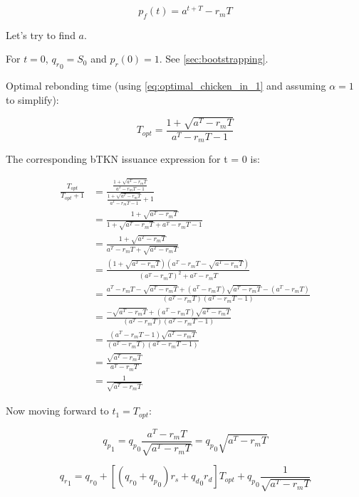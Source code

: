 \documentclass{article}
\begin{document}
\begin{equation}
  \label{eq:conservative-2}
p_f(t) = a^{t+T} - r_m T
\end{equation}

Let’s try to find $a$.

For $t=0$, ${q_r}_0 = S_0$ and $p_r(0) = 1$. See \ref{sec:bootstrapping}.

Optimal rebonding time (using \ref{eq:optimal_chicken_in_1} and assuming $\alpha = 1$ to simplify):

\begin{equation}
  \label{eq:conservative_T_OP}
T_{opt} = \frac{1+ \sqrt{a^T - r_mT}}{a^T - r_mT - 1}
\end{equation}

The corresponding bTKN issuance expression for t = 0 is:

\begin{equation}
  \label{eq:conservative_issuance_proportion}
  \begin{split}
  \frac{T_{opt}}{T_{opt} + 1} & = \frac{\frac{1+ \sqrt{a^T - r_mT}}{a^T - r_mT - 1}}{\frac{1+ \sqrt{a^T - r_mT}}{a^T - r_mT - 1} + 1} \\
  & = \frac{1+ \sqrt{a^T - r_mT}}{1+ \sqrt{a^T - r_mT} + a^T - r_mT - 1} \\
  & = \frac{1+ \sqrt{a^T - r_mT}}{a^T - r_mT + \sqrt{a^T - r_mT}} \\
  & = \frac{(1+ \sqrt{a^T - r_mT})(a^T - r_mT - \sqrt{a^T - r_mT})}{(a^T - r_mT)^2 + a^T - r_mT} \\
  & = \frac{a^T - r_mT - \sqrt{a^T - r_mT} + (a^T - r_mT)\sqrt{a^T - r_mT} - (a^T - r_mT)}{(a^T - r_mT)(a^T - r_mT - 1)} \\
  & = \frac{- \sqrt{a^T - r_mT} + (a^T - r_mT)\sqrt{a^T - r_mT}}{(a^T - r_mT)(a^T - r_mT - 1)} \\
  & = \frac{(a^T - r_mT - 1)\sqrt{a^T - r_mT}}{(a^T - r_mT)(a^T - r_mT - 1)} \\
  & = \frac{\sqrt{a^T - r_mT}}{a^T - r_mT} \\
  & = \frac{1}{\sqrt{a^T - r_mT}}
  \end{split}
\end{equation}

Now moving forward to $t_1 = T_{opt}$:

\[
{q_p}_1 = {q_p}_0 \frac{a^T -r_mT}{\sqrt{a^T -r_mT}} = {q_p}_0 \sqrt{a^T - r_mT}
\]

\[
{q_r}_1 = {q_r}_0 + [({q_r}_0 + {q_p}_0)r_s + {q_d}_0 r_d] T_{opt} + {q_p}_0 \frac{1}{\sqrt{a^T - r_mT}}
\]
\end{document}
